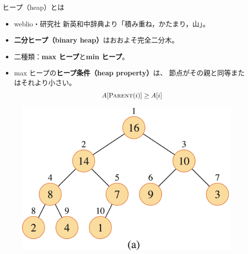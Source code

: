 \documentclass[unicode,11pt,aspectratio=169,notes]{beamer} %
\begin{document}
\begin{frame}{ヒープ（heap）とは}
  \begin{itemize}
    \item weblio・研究社 新英和中辞典より「積み重ね，かたまり，山」。
    \item \textbf{二分ヒープ（binary heap）}はおおよそ完全二分木。
    \item 二種類：\textbf{max ヒープ}と\textbf{min ヒープ}。
    \item max ヒープの\textbf{ヒープ条件（heap property）}は、
    節点がその親と同等またはそれより小さい。
    \[
      A[\textsc{Parent}(i)] \geq A[i]
    \]
  \end{itemize}
  \begin{figure}
    \includegraphics[height=0.4\textheight]{../resources/fig06.01a}
  \end{figure}
\end{frame}

\end{document}
